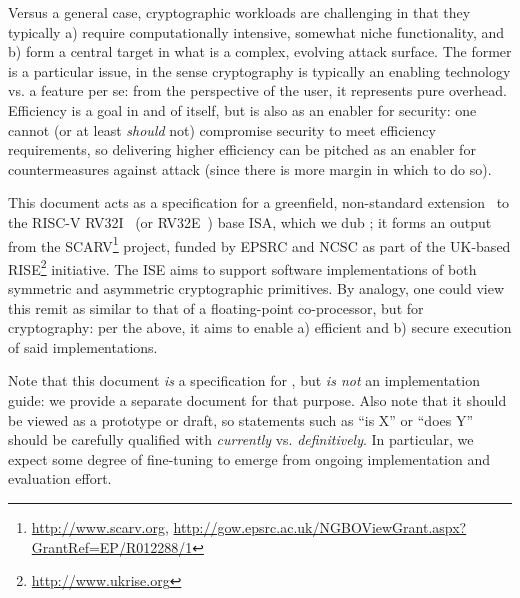 
Versus a general case, cryptographic workloads are challenging in that they
typically
a) require computationally intensive, somewhat niche functionality,
   and
b) form a central target in what is a complex, evolving attack surface.
The former is a particular issue, in the sense cryptography is typically an
enabling technology vs. a feature per se: from the perspective of the user,
it represents pure overhead.  Efficiency is a goal in and of itself, but is
also as an enabler for security: one cannot (or at least {\em should} not)
compromise security to meet efficiency requirements, so delivering higher
efficiency can be pitched as an enabler for countermeasures against attack
(since there is more margin in which to do so).

This document acts as a specification for a 
greenfield, non-standard extension~\cite[Section 21.1]{SCARV:RV:ISA:I:17} 
to the RISC-V 
RV32I~\cite[Section 2]{SCARV:RV:ISA:I:17} (or RV32E~\cite[Section 3]{SCARV:RV:ISA:I:17})
base ISA, which we dub \ISE; it forms an output from the SCARV\footnote{
\url{http://www.scarv.org}, \url{http://gow.epsrc.ac.uk/NGBOViewGrant.aspx?GrantRef=EP/R012288/1}
} project, funded by EPSRC and NCSC as part of the UK-based RISE\footnote{
\url{http://www.ukrise.org}
} initiative.
The \ISE ISE aims to support software implementations of both symmetric and 
asymmetric cryptographic primitives.  By analogy, one could view this remit
as similar to that of a floating-point co-processor, but for cryptography: 
per the above, it aims to enable
a) efficient
   and
b) secure
execution of said implementations.

Note that this document {\em is} a specification for \ISE, but {\em is not} 
an implementation guide: we provide a separate document for that purpose.
Also note that it should be viewed as a prototype or draft, so statements 
such as 
``\ISE is   X'' 
or
``\ISE does Y''
should be carefully qualified with {\em currently} vs. {\em definitively}.  
In particular, we expect some degree of fine-tuning to emerge from ongoing
implementation and evaluation effort.

